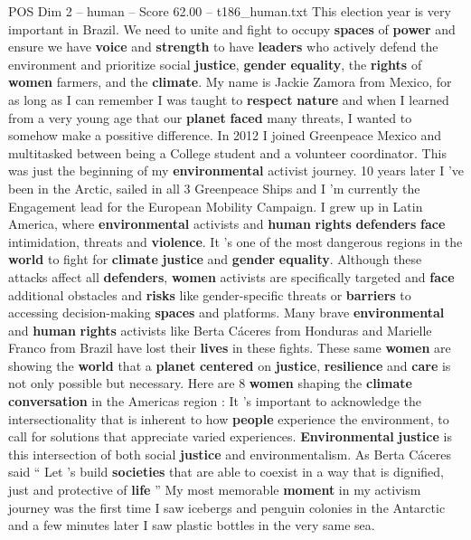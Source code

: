 \begin{textsample}{POS Dim 2 – human – Score 62.00 – t186\_human.txt}
This election year is very important in Brazil.
We need to unite and fight to occupy \textbf{spaces} of \textbf{power} and ensure we have \textbf{voice} and \textbf{strength} to have \textbf{leaders} who actively defend the environment and prioritize social \textbf{justice}, \textbf{gender} \textbf{equality}, the \textbf{rights} of \textbf{women} farmers, and the \textbf{climate}.
My name is Jackie Zamora from Mexico, for as long as I can remember I was taught to \textbf{respect} \textbf{nature} and when I learned from a very young age that our \textbf{planet} \textbf{faced} many threats, I wanted to somehow make a possitive difference.
In 2012 I joined Greenpeace Mexico and multitasked between being a College student and a volunteer coordinator.
This was just the beginning of my \textbf{environmental} activist journey. 10 years later I ’ve been in the Arctic, sailed in all 3 Greenpeace Ships and I ’m currently the Engagement lead for the European Mobility Campaign.
I grew up in Latin America, where \textbf{environmental} activists and \textbf{human} \textbf{rights} \textbf{defenders} \textbf{face} intimidation, threats and \textbf{violence}.
It ’s one of the most dangerous regions in the \textbf{world} to fight for \textbf{climate} \textbf{justice} and \textbf{gender} \textbf{equality}.
Although these attacks affect all \textbf{defenders}, \textbf{women} activists are specifically targeted and \textbf{face} additional obstacles and \textbf{risks} like gender-specific threats or \textbf{barriers} to accessing decision-making \textbf{spaces} and platforms.
Many brave \textbf{environmental} and \textbf{human} \textbf{rights} activists like Berta Cáceres from Honduras and Marielle Franco from Brazil have lost their \textbf{lives} in these fights.
These same \textbf{women} are showing the \textbf{world} that a \textbf{planet} \textbf{centered} on \textbf{justice}, \textbf{resilience} and \textbf{care} is not only possible but necessary.
Here are 8 \textbf{women} shaping the \textbf{climate} \textbf{conversation} in the Americas region : It ’s important to acknowledge the intersectionality that is inherent to how \textbf{people} experience the environment, to call for solutions that appreciate varied experiences. \textbf{Environmental} \textbf{justice} is this intersection of both social \textbf{justice} and environmentalism.
As Berta Cáceres said “ Let ’s build \textbf{societies} that are able to coexist in a way that is dignified, just and protective of \textbf{life} ” My most memorable \textbf{moment} in my activism journey was the first time I saw icebergs and penguin colonies in the Antarctic and a few minutes later I saw plastic bottles in the very same sea.

\end{textsample}
